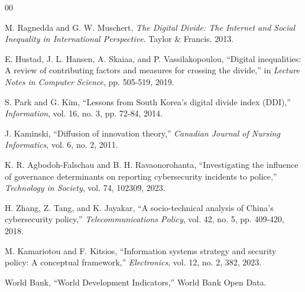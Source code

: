 \documentclass[conference]{IEEEtran}
\begin{document}
\begin{thebibliography}{00}

M. Ragnedda and G. W. Muschert, \emph{The Digital Divide: The Internet and Social Inequality in International Perspective}. Taylor \& Francis, 2013.

E. Hustad, J. L. Hansen, A. Skaiaa, and P. Vassilakopoulou, ``Digital inequalities: A review of contributing factors and measures for crossing the divide,'' in \emph{Lecture Notes in Computer Science}, pp. 505-519, 2019.

S. Park and G. Kim, ``Lessons from South Korea's digital divide index (DDI),'' \emph{Information}, vol. 16, no. 3, pp. 72-84, 2014.

J. Kaminski, ``Diffusion of innovation theory,'' \emph{Canadian Journal of Nursing Informatics}, vol. 6, no. 2, 2011.

K. R. Agbodoh-Falschau and B. H. Ravaonorohanta, ``Investigating the influence of governance determinants on reporting cybersecurity incidents to police,'' \emph{Technology in Society}, vol. 74, 102309, 2023.

H. Zhang, Z. Tang, and K. Jayakar, ``A socio-technical analysis of China's cybersecurity policy,'' \emph{Telecommunications Policy}, vol. 42, no. 5, pp. 409-420, 2018.

M. Kamariotou and F. Kitsios, ``Information systems strategy and security policy: A conceptual framework,'' \emph{Electronics}, vol. 12, no. 2, 382, 2023.

World Bank, ``World Development Indicators,'' World Bank Open Data.

\end{thebibliography}
\end{document}
